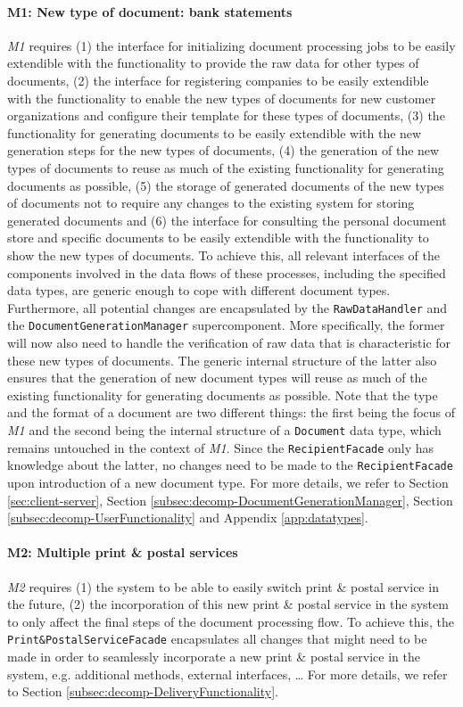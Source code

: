 \documentclass[a4paper,10pt]{article}
\begin{document}
\paragraph{M1: New type of document: bank statements}
\textit{M1} requires (1) the interface for initializing document processing jobs to be easily extendible with the functionality to provide the raw data for other types of documents, (2) the interface for registering companies to be easily extendible with the functionality to enable the new types of documents for new customer organizations and configure their template for these types of documents, (3) the functionality for generating documents to be easily extendible with the new generation steps for the new types of documents, (4) the generation of the new types of documents to reuse as much of the existing functionality for generating documents as possible, (5) the storage of generated documents of the new types of documents not to require any changes to the existing system for storing generated documents and (6) the interface for consulting the personal document store and specific documents to be easily extendible with the functionality to show the new types of documents. To achieve this, all relevant interfaces of the components involved in the data flows of these processes, including the specified data types, are generic enough to cope with different document types. Furthermore, all potential changes are encapsulated by the \texttt{RawDataHandler} and the \texttt{DocumentGenerationManager} supercomponent. More specifically, the former will now also need to handle the verification of raw data that is characteristic for these new types of documents. The generic internal structure of the latter also ensures that the generation of new document types will reuse as much of the existing functionality for generating documents as possible. Note that the type and the format of a document are two different things: the first being the focus of \textit{M1} and the second being the internal structure of a \texttt{Document} data type, which remains untouched in the context of \textit{M1}. Since the \texttt{RecipientFacade} only has knowledge about the latter, no changes need to be made to the \texttt{RecipientFacade} upon introduction of a new document type.
For more details, we refer to Section \ref{sec:client-server}, Section \ref{subsec:decomp-DocumentGenerationManager}, Section \ref{subsec:decomp-UserFunctionality} and Appendix \ref*{app:datatypes}.

\paragraph{M2: Multiple print \& postal services}
\textit{M2} requires (1) the system to be able to easily switch print \& postal service in the future, (2) the incorporation of this new print \& postal service in the system to only affect the final steps of the document processing flow. To achieve this, the \texttt{Print\&PostalServiceFacade} encapsulates all changes that might need to be made in order to seamlessly incorporate a new print \& postal service in the system, e.g. additional methods, external interfaces, \dots
For more details, we refer to Section \ref{subsec:decomp-DeliveryFunctionality}.
\end{document}
